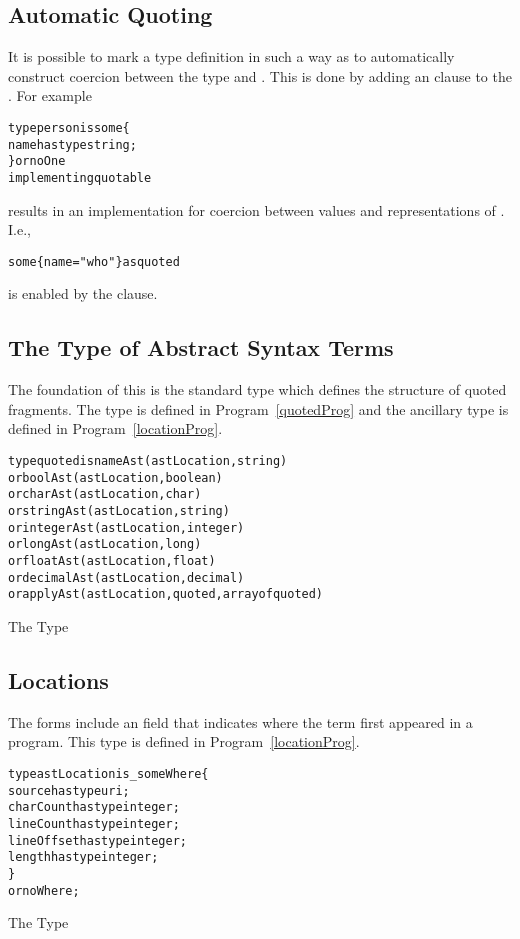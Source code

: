 \subsection{Automatic Quoting}
It is possible to mark a type definition in such a way as to automatically construct coercion between the type and . This is done by adding an  clause to the . For example
\begin{alltt}
type person is some\{
  name has type string;
\} or noOne 
  implementing quotable
\end{alltt}
results in an implementation for coercion between  values and  representations of . I.e., 
\begin{alltt}
some\{name = "who"\} as quoted
\end{alltt}
is enabled by the  clause.

\subsection{The Type of Abstract Syntax Terms}
The foundation of this is the standard  type which defines the structure of quoted fragments. The  type is defined in Program~\vref{quotedProg} and the ancillary type  is defined in Program~\vref{locationProg}.
\begin{program}
\begin{alltt}
type quoted is nameAst(astLocation,string)
            or boolAst(astLocation,boolean)
            or charAst(astLocation,char)
            or stringAst(astLocation,string)
            or integerAst(astLocation,integer)
            or longAst(astLocation,long)
            or floatAst(astLocation,float)
            or decimalAst(astLocation,decimal)
            or applyAst(astLocation,quoted,array of quoted)
\end{alltt}
\caption{The  Type\label{quotedProg}}
\end{program}

\subsection{Locations}
The  forms include an  field that indicates where the  term first appeared in a program. This type is defined in Program~\vref{locationProg}.
\begin{program}[htb]
\begin{alltt}
type astLocation is _someWhere\{
    source has type uri;
    charCount has type integer;
    lineCount has type integer;
    lineOffset has type integer;
    length has type integer;
  \}
  or noWhere;
\end{alltt}
\caption{The  Type\label{locationProg}}
\end{program}

